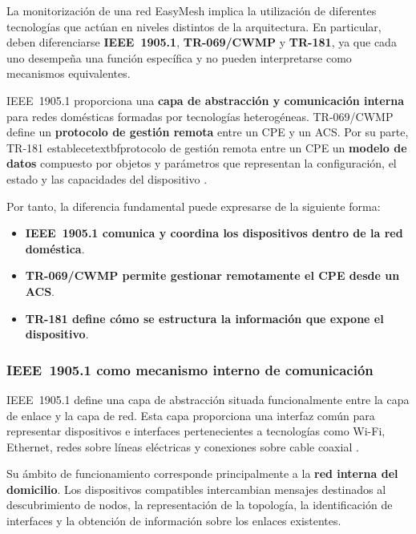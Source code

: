 La monitorización de una red EasyMesh implica la utilización de
diferentes tecnologías que actúan en niveles distintos de la
arquitectura. En particular, deben diferenciarse
\textbf{IEEE~1905.1}, \textbf{TR-069/CWMP} y
\textbf{TR-181}, ya que cada uno desempeña una función específica y no
pueden interpretarse como mecanismos equivalentes.

IEEE~1905.1 proporciona una
\textbf{capa de abstracción y comunicación interna} para redes domésticas
formadas por tecnologías heterogéneas. TR-069/CWMP define un
\textbf{protocolo de gestión remota} entre un CPE y un ACS. Por su parte,
TR-181 establecetextbf{protocolo de gestión remota} entre un CPE un \textbf{modelo de datos} compuesto por objetos y
parámetros que representan la configuración, el estado y las
capacidades del dispositivo
\cite{ieee_1905_1,bbf_tr069,bbf_tr181}.

Por tanto, la diferencia fundamental puede expresarse de la siguiente
forma:

\begin{itemize}
    \item \textbf{IEEE~1905.1 comunica y coordina los dispositivos
    dentro de la red doméstica}.

    \item \textbf{TR-069/CWMP permite gestionar remotamente el CPE desde
    un ACS}.

    \item \textbf{TR-181 define cómo se estructura la información que
    expone el dispositivo}.
\end{itemize}


\subsubsection*{IEEE~1905.1 como mecanismo interno de comunicación}

IEEE~1905.1 define una capa de abstracción situada funcionalmente entre
la capa de enlace y la capa de red. Esta capa proporciona una interfaz
común para representar dispositivos e interfaces pertenecientes a
tecnologías como Wi-Fi, Ethernet, redes sobre líneas eléctricas y
conexiones sobre cable coaxial \cite{ieee_1905_1}.

Su ámbito de funcionamiento corresponde principalmente a la
\textbf{red interna del domicilio}. Los dispositivos compatibles
intercambian mensajes destinados al descubrimiento de nodos, la
representación de la topología, la identificación de interfaces y la
obtención de información sobre los enlaces existentes.

